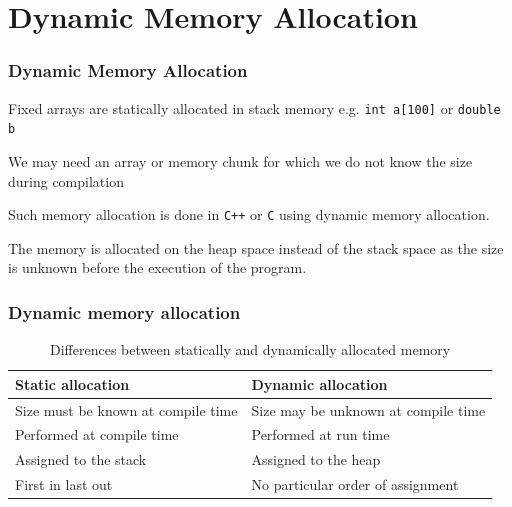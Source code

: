 \documentclass{beamer}
\begin{document}
\section{Dynamic Memory Allocation}
\begin{frame}[fragile]
\frametitle{Dynamic Memory Allocation}

Fixed arrays are statically allocated in stack memory 
e.g. \verb|int a[100]| or \verb|double b|

\medskip

We may need an array or memory chunk for which we do not know the size
during compilation

\medskip

Such memory allocation is done in \texttt{C++} or \texttt{C} using
dynamic memory allocation. 

\medskip

The memory is allocated on the heap space
instead of the stack space as the size is unknown before the execution
of the program.



\end{frame}
\begin{frame}
\frametitle{Dynamic memory allocation}
\begin{table}
\begin{scriptsize}

\centering
\begin{tabular}{|l|l|}
\hline 
\textbf{Static allocation} & \textbf{Dynamic allocation} \\ 
\hline 
Size must be known at compile time & Size may be unknown at compile time \\ 
\hline 
Performed at compile time & Performed at run time \\ 
\hline 
Assigned to the stack & Assigned to the heap \\ 
\hline 
First in last out & No particular order of assignment \\ 
\hline 
\end{tabular} 
\caption{Differences between statically and dynamically allocated memory}

\end{scriptsize}

\end{table}

\end{frame}
\end{document}
